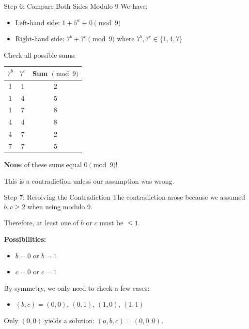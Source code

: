 \begin{frame}{Step 6: Compare Both Sides Modulo 9}
    We have:
    \begin{itemize}
        \item Left-hand side: $1 + 5^a \equiv 0 \pmod 9$
        \item Right-hand side: $7^b + 7^c \pmod 9$ where $7^b, 7^c \in \{1,4,7\}$
    \end{itemize}
    
    Check all possible sums:
    \begin{center}
    \begin{tabular}{c|c|c}
        $7^b$ & $7^c$ & Sum $\pmod 9$ \\ \hline
        1 & 1 & 2 \\
        1 & 4 & 5 \\
        1 & 7 & 8 \\
        4 & 4 & 8 \\
        4 & 7 & 2 \\
        7 & 7 & 5
    \end{tabular}
    \end{center}
    
    \textbf{None} of these sums equal $0 \pmod 9$!
    
    This is a contradiction unless our assumption was wrong.
\end{frame}

\begin{frame}{Step 7: Resolving the Contradiction}
    The contradiction arose because we assumed $b,c \geq 2$ when using modulo 9.
    
    Therefore, at least one of $b$ or $c$ must be $\leq 1$.
    
    \textbf{Possibilities:}
    \begin{itemize}
        \item $b = 0$ or $b = 1$
        \item $c = 0$ or $c = 1$
    \end{itemize}
    
    By symmetry, we only need to check a few cases:
    \begin{itemize}
        \item $(b,c) = (0,0)$, $(0,1)$, $(1,0)$, $(1,1)$
    \end{itemize}
    
    Only $(0,0)$ yields a solution: $(a,b,c) = (0,0,0)$.
\end{frame}

